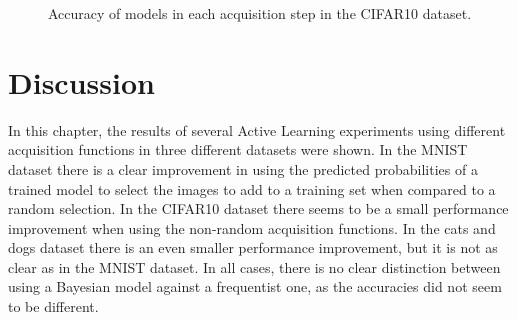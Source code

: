 \begin{figure}[H]
    \centering
    \hfill
    \caption{Accuracy of models in each acquisition step in the CIFAR10 dataset.}
    \label{fig:CIFAR10_bayesian_vs_freq}
\end{figure}



\section{Discussion}

In this chapter, the results of several Active Learning experiments using different acquisition functions in three different datasets were shown. In the MNIST dataset there is a clear improvement in using the predicted probabilities of a trained model to select the images to add to a training set when compared to a random selection. In the CIFAR10 dataset there seems to be a small performance improvement when using the non-random acquisition functions. In the cats and dogs dataset there is an even smaller performance improvement, but it is not as clear as in the MNIST dataset. In all cases, there is no clear distinction between using a Bayesian model against a frequentist one, as the accuracies did not seem to be different.

%
%
%
%
